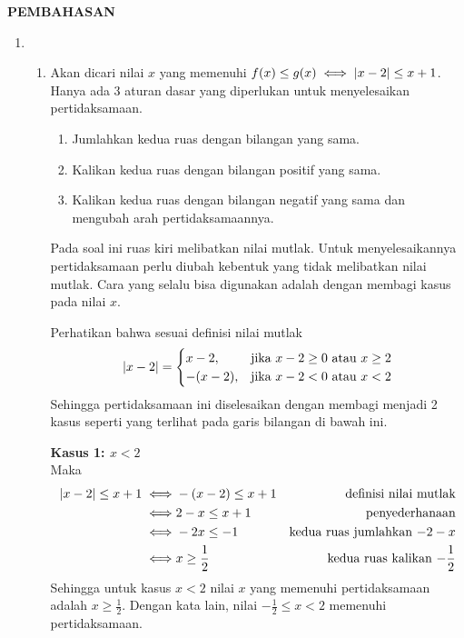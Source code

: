 \begin{center}
    \textbf{\large{PEMBAHASAN}}
\end{center}
\begin{enumerate}[leftmargin=*, label={\arabic*}.]
\item
\begin{enumerate}[label={\alph*}.]
\item Akan dicari nilai $x$ yang memenuhi
$f(x) \leq g(x) \iff \lvert x-2\rvert \leq x+1$.\\
Hanya ada 3 aturan dasar yang diperlukan untuk menyelesaikan pertidaksamaan.
\begin{enumerate}[label={\arabic*})]
    \item Jumlahkan kedua ruas dengan bilangan yang sama.
    \item Kalikan kedua ruas dengan bilangan positif yang sama.
    \item Kalikan kedua ruas dengan bilangan negatif yang sama dan 
    mengubah arah pertidaksamaannya.
\end{enumerate}
Pada soal ini ruas kiri melibatkan nilai mutlak. Untuk menyelesaikannya 
pertidaksamaan perlu diubah kebentuk yang tidak melibatkan nilai mutlak. 
Cara yang selalu bisa digunakan adalah dengan membagi kasus pada nilai $x$.
    
Perhatikan bahwa sesuai definisi nilai mutlak
\[
\lvert x-2\rvert = 
\begin{cases}
    x-2, &\text{jika $x-2 \geq 0$ atau $x \geq 2$}\\
    -(x-2), &\text{jika $x-2 < 0$ atau $x < 2$}
\end{cases}
\]
Sehingga pertidaksamaan ini diselesaikan dengan membagi menjadi 2 kasus 
seperti yang terlihat pada garis bilangan di bawah ini.
    
\vspace{0.2cm}
    
\textbf{Kasus 1: $x < 2$}\\
Maka
\begin{align*}
    \lvert x-2\rvert \leq x+1
    \iff &-(x-2) \leq x+1 
    &\text{definisi nilai mutlak} \\
    \iff &2-x \leq x+1
    &\text{penyederhanaan}\\
    \iff &-2x \leq -1
    &\text{kedua ruas jumlahkan $-2-x$}\\
    \iff &x \geq \frac{1}{2}
    &\text{kedua ruas kalikan $-\frac{1}{2}$}
\end{align*}
Sehingga untuk kasus $x < 2$ nilai $x$ yang memenuhi pertidaksamaan adalah 
$x \geq \frac{1}{2}$. Dengan kata lain, nilai $-\frac{1}{2} \leq x < 2$ 
memenuhi pertidaksamaan.
    

\end{enumerate}
\end{enumerate}
